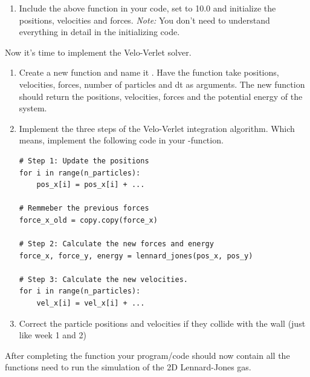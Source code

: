 \documentclass{article}
\begin{document}
\begin{enumerate}[resume]
    \item Include the above  function in your code, set  to 10.0 and initialize the positions, velocities and forces.
    {\em Note:} You don't need to understand everything in detail in the initializing code.
\end{enumerate}

Now it's time to implement the Velo-Verlet solver.

\begin{enumerate}[resume]

    \item Create a new function and name it .
        Have the function take positions, velocities, forces, number of particles and dt as arguments.
        The new function should return the positions, velocities, forces and the potential energy of the system.

    \newpage

    \item Implement the three steps of the Velo-Verlet integration algorithm.
        Which means, implement the following code in your -function.

\begin{lstlisting}
# Step 1: Update the positions
for i in range(n_particles):
    pos_x[i] = pos_x[i] + ...

# Remmeber the previous forces
force_x_old = copy.copy(force_x)

# Step 2: Calculate the new forces and energy
force_x, force_y, energy = lennard_jones(pos_x, pos_y)

# Step 3: Calculate the new velocities.
for i in range(n_particles):
    vel_x[i] = vel_x[i] + ...

\end{lstlisting}

    \item Correct the particle positions and velocities if they collide with the wall (just like week 1 and 2)

\end{enumerate}

After completing the  function your program/code should now contain all the functions need to run the simulation of the 2D Lennard-Jones gas.
\end{document}
